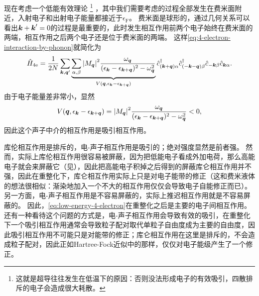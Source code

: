 \documentclass[hyperref, UTF8, a4paper]{ctexart}
\renewcommand{\autoref}{\prettyref}
\begin{document}
现在考虑一个低能有效理论%
\footnote{这就是超导往往发生在低温下的原因：否则没法形成电子的有效吸引，四散排斥的电子会造成很大耗散。}%
，其中我们需要考虑的过程全部发生在费米面附近，入射电子和出射电子能量都接近于$\epsilon_\text{F}$。
费米面是球形的，通过几何关系可以看出$\vb*{k} + \vb*{k}' = 0$的过程是最重要的，此时发生相互作用前两个电子始终在费米面的两端，相互作用之后两个电子还是位于费米面的两端。
这样\eqref{eq:4-electron-interaction-by-phonon}就简化为
\begin{equation}
    \hat{H}_{4\text{e}} = \frac{1}{2N} \sum_{\vb*{k}, \vb*{q}'} \underbrace{\sum_{\alpha, \beta} \abs{M_{\vb*{q}}}^2 \frac{\omega_{\vb*{q}}}{(\epsilon_{\vb*{k}} - \epsilon_{\vb*{k}+\vb*{q}})^2 - \omega_{\vb*{q}}^2}}_{V(\vb*{q}, \epsilon_{\vb*{k}} - \epsilon_{\vb*{k}+\vb*{q}})} \hat{c}^\dagger_{(\vb*{k}+\vb*{q}) \alpha} \hat{c}^\dagger_{(-\vb*{k}-\vb*{q}) \beta} \hat{c}_{-\vb*{k} \beta} \hat{c}_{\vb*{k} \alpha}.
    \label{eq:low-energy-4-electron}
\end{equation}
由于电子能量差非常小，显然
\[
    V(\vb*{q}, \epsilon_{\vb*{k}} - \epsilon_{\vb*{k}+\vb*{q}}) = \abs{M_{\vb*{q}}}^2 \frac{\omega_{\vb*{q}}}{(\epsilon_{\vb*{k}} - \epsilon_{\vb*{k}+\vb*{q}})^2 - \omega_{\vb*{q}}^2} < 0,
\]
因此这个声子中介的相互作用是吸引相互作用。

库伦相互作用是排斥的，电-声子相互作用是吸引的；绝对强度显然是前者强。
然而，实际上库伦相互作用很容易被屏蔽，因为把低能电子看成外加电荷，那么高能电子就会来屏蔽它（见\autoref{sec:ext-e}），因此把高能电子积掉之后得到的屏蔽库仑相互作用并不强，因此在重整化下，库仑相互作用实际上只是对电子能带的修正（这和费米液体的想法很相似：渐染地加入一个不大的相互作用仅仅会导致电子自能修正而已）。
另一方面，电-声子相互作用是不容易屏蔽的，实际上推迟相互作用就是不容易屏蔽的。
因此，\eqref{eq:low-energy-4-electron}在重整化之后是主要的电子间相互作用。
还有一种看待这个问题的方式是，电-声子相互作用会导致有效的吸引，在重整化下一个吸引相互作用通常会导致粒子配对取代单粒子自由度成为主要的自由度，因此吸引相互作用不可能只是对能带的修正；库仑相互作用在这里是排斥的，不会造成粒子配对，因此正如Hartree-Fock近似中的那样，仅仅对电子能级产生了一个修正。
\end{document}
